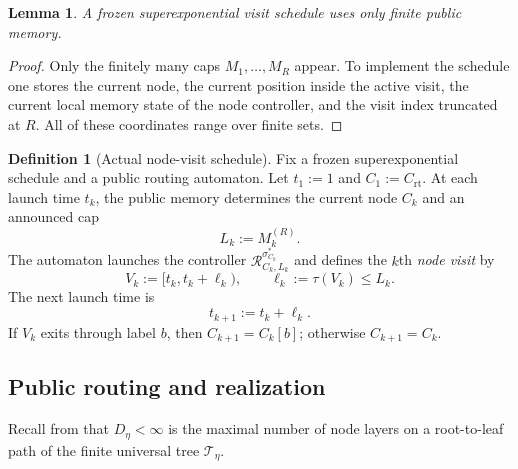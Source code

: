 \documentclass[12pt]{article}
\newtheorem{lemma}[theorem]{Lemma}
\theoremstyle{definition}
\newtheorem{definition}[theorem]{Definition}
\newcommand{\1}{\mathbf{1}}
\newcommand{\cT}{\mathcal{T}}
\begin{document}
\begin{lemma}
\label{lem:frozen-memory}
A frozen superexponential visit schedule uses only finite public memory.
\end{lemma}

\begin{proof}
Only the finitely many caps $M_1,\dots,M_R$ appear. To implement the schedule one
stores the current node, the current position inside the active visit, the
current local memory state of the node controller, and the visit index truncated
at $R$. All of these coordinates range over finite sets.
\end{proof}

\begin{definition}[Actual node-visit schedule]
\label{def:visit-schedule}
Fix a frozen superexponential schedule and a public routing automaton. Let
$t_1:=1$ and $C_1:=C_{\mathrm{rt}}$. At each launch time $t_k$, the public memory
determines the current node $C_k$ and an announced cap
\[
L_k:=M_k^{(R)}.
\]
The automaton launches the controller
$\mathcal R_{C_k,L_k}^{\sigma_{C_k}^*}$ and defines the $k$th \emph{node visit}
by
\[
V_k:=[t_k,t_k+\ell_k),
\qquad
\ell_k:=\tau(V_k)\le L_k.
\]
The next launch time is
\[
t_{k+1}:=t_k+\ell_k.
\]
If $V_k$ exits through label $b$, then $C_{k+1}=C_k[b]$; otherwise
$C_{k+1}=C_k$.
\end{definition}

\subsection{Public routing and realization}

Recall from  that $D_\eta<\infty$ is the maximal number of
node layers on a root-to-leaf path of the finite universal tree $\cT_\eta$.
\end{document}
